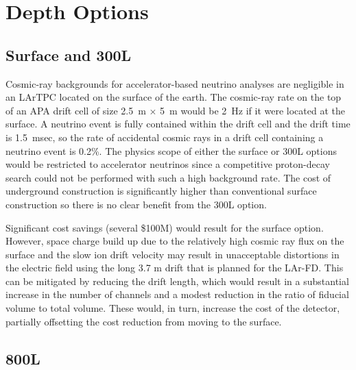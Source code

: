 \section{Depth Options}

\subsection{Surface and 300L}

Cosmic-ray backgrounds for accelerator-based neutrino analyses are negligible in an LArTPC located on the surface of the earth. The cosmic-ray rate on the top of an APA drift cell of size 2.5~m $\times$ 5~m would be 2~Hz if it were located at the surface. A neutrino event is fully contained within the drift cell and the drift time is 1.5~msec, so the rate of accidental cosmic rays in a drift cell containing a neutrino event is 0.2\%.  The physics scope of either the surface
or 300L options would be restricted to accelerator neutrinos since a competitive proton-decay search could not be performed with such a high background rate. The cost of underground construction is significantly higher than conventional surface construction so there is no clear benefit from the 300L option. 

Significant cost savings (several \$100M) would result for the surface option.  However, space charge build up due to the relatively high cosmic ray flux on the surface and the slow ion drift velocity may result in unacceptable distortions in the electric field using the long 3.7 m drift that is planned for the LAr-FD.  This can be mitigated by reducing the drift length, which would result in a substantial increase in the number of channels and a modest reduction in the ratio of fiducial volume to total volume.  These would, in turn, increase the cost of the detector, partially offsetting the cost reduction from moving to the surface.

\subsection{800L}

